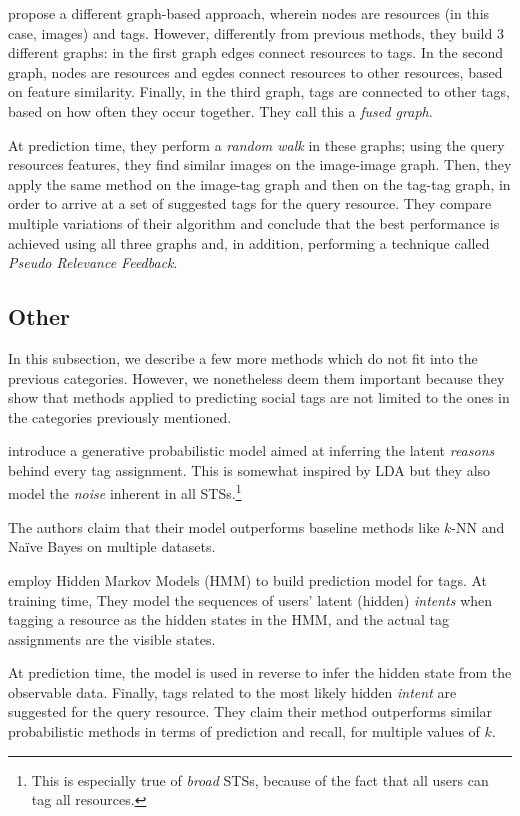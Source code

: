 \cite{kakade_kakade_2013} propose a different graph-based approach, wherein nodes are resources (in this case, images) and tags. However, differently from previous methods, they build 3 different graphs: in the first graph edges connect resources to tags. In the second graph, nodes are resources and egdes connect resources to other resources, based on feature similarity. Finally, in the third graph, tags are connected to other tags, based on how often they occur together. They call this a \textit{fused graph}.

At prediction time, they perform a \textit{random walk} in these graphs; using the query resources features, they find similar images on the image-image graph. Then, they apply the same method on the image-tag graph and then on the tag-tag graph, in order to arrive at a set of suggested tags for the query resource. They compare multiple variations of their algorithm and conclude that the best performance is achieved using all three graphs and, in addition, performing a technique called \textit{Pseudo Relevance Feedback}.

\subsection{Other}

In this subsection, we describe a few more methods which do not fit into the previous categories. However, we nonetheless deem them important because they show that methods applied to predicting social tags are not limited to the ones in the categories previously mentioned. 

\cite{si_sun_2010} introduce a generative probabilistic model aimed at inferring the  latent \textit{reasons} behind every tag assignment. This is somewhat inspired by LDA but they also model the \textit{noise} inherent in all STSs.\footnote{This is especially true of \textit{broad} STSs, because of the fact that all users can tag all resources.}

The authors claim that their model outperforms baseline methods like $k$-NN and Naïve Bayes on multiple datasets.

\cite{trabelsi_etal_2012} employ Hidden Markov Models (HMM) \citep{rabiner_1989} to build prediction model for tags. At training time, They model the sequences of users' latent (hidden) \textit{intents} when tagging a resource as the hidden states in the HMM, and the actual tag assignments are the visible states.

At prediction time, the model is used in reverse to infer the hidden state from the observable data. Finally, tags related to the most likely hidden \textit{intent} are suggested for the query resource. They claim their method outperforms similar probabilistic methods in terms of prediction and recall, for multiple values of $k$.

